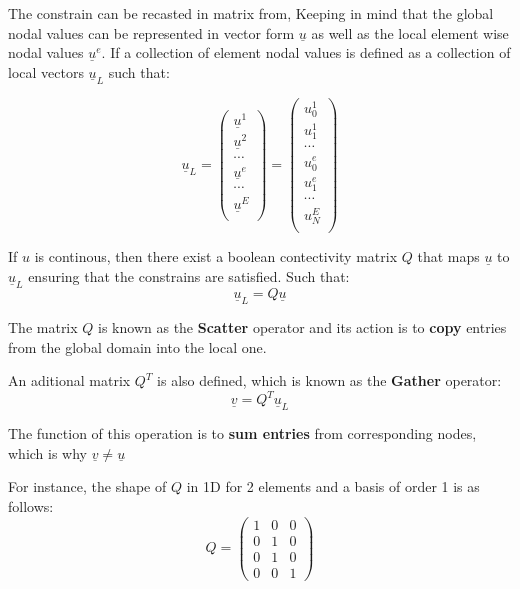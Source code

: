 \documentclass[
  a4paper,
  10pt]{article}
\begin{document}
The constrain can be recasted in matrix from, Keeping in mind that the
global nodal values can be represented in vector form \(\underline{u}\)
as well as the local element wise nodal values \(\underline{u}^{e}\). If
a collection of element nodal values is defined as a collection of local
vectors \(\underline{u}_L\) such that:

\begin{equation}
    \underline{u}_L=
    \begin{pmatrix}
    \underline{u}^{1} \\
    \underline{u}^{2} \\
    \cdots \\
    \underline{u}^{e} \\
    \cdots \\
    \underline{u}^{E} \\
    \end{pmatrix}= 
    \begin{pmatrix}
    {u}^{1}_{0} \\
    {u}^{1}_{1} \\
    \cdots \\
    {u}^{e}_{0} \\
    {u}^{e}_{1} \\
    \cdots \\
    {u}^{E}_{N} \\
    \end{pmatrix}
\end{equation}

If \(u\) is continous, then there exist a boolean contectivity matrix
\(Q\) that maps \(\underline{u}\) to \(\underline{u}_L\) ensuring that
the constrains are satisfied. Such that: \begin{equation}
    \underline{u}_L=Q\underline{u}
\end{equation}

The matrix \(Q\) is known as the \textbf{Scatter} operator and its
action is to \textbf{copy} entries from the global domain into the local
one.

An aditional matrix \(Q^{T}\) is also defined, which is known as the
\textbf{Gather} operator: \begin{equation}
    \underline{v}=Q^{T}\underline{u}_L
\end{equation}

The function of this operation is to \textbf{sum entries} from
corresponding nodes, which is why \(\underline{v} \neq \underline{u}\)

For instance, the shape of \(Q\) in 1D for 2 elements and a basis of
order 1 is as follows: \begin{equation}
    Q=
    \begin{pmatrix}
           1    &   0     &0 \\
           0    &    1    & 0\\
            0  &   1     & 0\\
            0   &    0    & 1
    \end{pmatrix} 
\end{equation}
\end{document}

